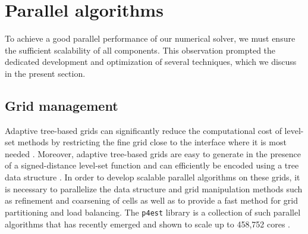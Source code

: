 \section{Parallel algorithms}\label{sec:parallel algorithms}

To achieve a good parallel performance of our numerical solver, we must ensure
the sufficient scalability of all components.  This observation prompted the
dedicated development and optimization of several techniques, which we discuss
in the present section.

\subsection{Grid management}

Adaptive tree-based grids can significantly reduce the computational cost of
level-set methods by restricting the fine grid close to the interface where it
is most needed \cite{Strain:99:Tree-Methods-for-Mov}.
Moreover, adaptive tree-based grids are easy to generate in the presence of a
signed-distance level-set function \cite{Min;Gibou:07:A-second-order-accur} and
can efficiently be encoded using a tree data structure
\cite{Samet:90:Applications-of-Spat}.
In order to develop scalable parallel algorithms on these grids, it is
necessary to parallelize the data structure and grid manipulation methods such
as refinement and coarsening of cells as well as to provide a fast method for
grid partitioning and load balancing.
The \texttt{p4est} library \cite{p4est-github} is a collection of such parallel
algorithms that has recently emerged and shown to scale up to 458,752 cores
\cite{IsaacBursteddeWilcoxEtAl15}.

